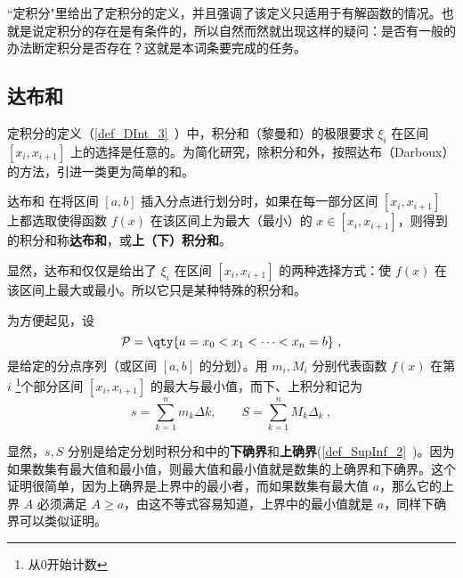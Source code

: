 
\begin{issues}
\end{issues}

“定积分"里给出了定积分的定义，并且强调了该定义只适用于有解函数的情况。也就是说定积分的存在是有条件的，所以自然而然就出现这样的疑问：是否有一般的办法断定积分是否存在？这就是本词条要完成的任务。
\subsection{达布和}
定积分的定义（\autoref{def_DInt_3}~）中，积分和（黎曼和）的极限要求 $\xi_i$ 在区间 $[x_i,x_{i+1}]$ 上的选择是任意的。为简化研究，除积分和外，按照达布（Darboux）的方法，引进一类更为简单的和。
\begin{definition}{达布和}
在将区间 $[a,b]$ 插入分点进行划分时，如果在每一部分区间 $[x_i,x_{i+1}]$ 上都选取使得函数 $f(x)$ 在该区间上为最大（最小）的 $x\in[x_i,x_{i+1}]$，则得到的积分和称\textbf{达布和}，或\textbf{上（下）积分和}。
\end{definition}
显然，达布和仅仅是给出了 $\xi_i$ 在区间 $[x_i,x_{i+1}]$ 的两种选择方式：使 $f(x)$ 在该区间上最大或最小。所以它只是某种特殊的积分和。

为方便起见，设
\begin{equation}
\mathcal P = \qty{a = x_0 < x_1 < \dots < x_n = b}~,
\end{equation}
是给定的分点序列（或区间 $[a,b]$ 的分划）。用 $m_i,M_i$ 分别代表函数 $f(x)$ 在第 $i$ \footnote{从0开始计数}个部分区间 $[x_i,x_{i+1}]$ 的最大与最小值，而下、上积分和记为
\begin{equation}
s= \sum_{k = 1}^n m_k\Delta k, \qquad  S = \sum_{k = 1}^n M_k \Delta_k~,
\end{equation}

显然，$s,S$ 分别是给定分划时积分和中的\textbf{下确界}和\textbf{上确界}(\autoref{def_SupInf_2}~)。因为如果数集有最大值和最小值，则最大值和最小值就是数集的上确界和下确界。这个证明很简单，因为上确界是上界中的最小者，而如果数集有最大值 $a$，那么它的上界 $A$ 必须满足 $A\geq a$，由这不等式容易知道，上界中的最小值就是 $a$，同样下确界可以类似证明。
